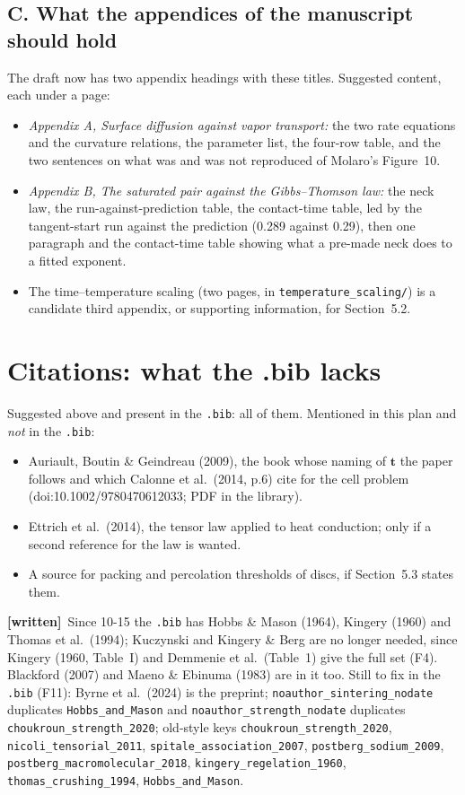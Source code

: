 \documentclass[11pt]{article}
\newcommand{\Have}{\textcolor{have}{\textbf{[written]}}\ }
\begin{document}
\subsection*{C. What the appendices of the manuscript should hold}
The draft now has two appendix headings with these titles. Suggested
content, each under a page:
\begin{itemize}
\item \emph{Appendix A, Surface diffusion against vapor transport:} the two
  rate equations and the curvature relations, the parameter list, the
  four-row table, and the two sentences on what was and was not reproduced
  of Molaro's Figure~10.
\item \emph{Appendix B, The saturated pair against the Gibbs--Thomson law:}
  the neck law, the run-against-prediction table, the contact-time table,
  led by the tangent-start run against the prediction (0.289 against
  0.29), then one paragraph and the contact-time table showing what a
  pre-made neck does to a fitted exponent.
\item The time--temperature scaling (two pages, in
  \texttt{temperature\_scaling/}) is a
  candidate third appendix, or supporting information, for Section~5.2.
\end{itemize}

\section*{Citations: what the .bib lacks}
Suggested above and present in the \texttt{.bib}: all of them. Mentioned in
this plan and \emph{not} in the \texttt{.bib}:
\begin{itemize}
\item Auriault, Boutin \& Geindreau (2009), the book whose naming of
  $\mathbf{t}$ the paper follows and which Calonne et al.\ (2014, p.6) cite
  for the cell problem (doi:10.1002/9780470612033; PDF in the library).
\item Ettrich et al.\ (2014), the tensor law applied to heat conduction;
  only if a second reference for the law is wanted.
\item A source for packing and percolation thresholds of discs, if
  Section~5.3 states them.
\end{itemize}
\Have Since 10-15 the \texttt{.bib} has Hobbs \& Mason (1964), Kingery (1960)
and Thomas et al.\ (1994); Kuczynski and Kingery \& Berg are no longer
needed, since Kingery (1960, Table~I) and Demmenie et al.\ (Table~1) give the
full set (F4). Blackford (2007) and Maeno \& Ebinuma (1983) are in it too.
Still to fix in the \texttt{.bib} (F11): Byrne et al.\ (2024) is the
preprint; \texttt{noauthor\_sintering\_nodate} duplicates
\texttt{Hobbs\_and\_Mason} and \texttt{noauthor\_strength\_nodate} duplicates
\texttt{choukroun\_strength\_2020}; old-style keys
\texttt{choukroun\_strength\_2020}, \texttt{nicoli\_tensorial\_2011},
\texttt{spitale\_association\_2007}, \texttt{postberg\_sodium\_2009},
\texttt{postberg\_macromolecular\_2018}, \texttt{kingery\_regelation\_1960},
\texttt{thomas\_crushing\_1994}, \texttt{Hobbs\_and\_Mason}.
\end{document}

